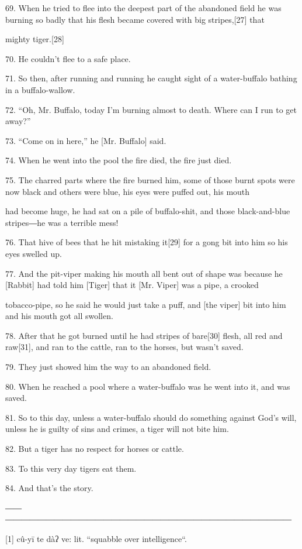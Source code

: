 {69. When he tried to flee into the deepest part of the abandoned field
he was burning so badly that his flesh became covered with big stripes,[27] that
}

{mighty tiger.[28]}

{70. He couldn't flee to a safe place.}

{71. So then, after running and running he caught sight of a water-buffalo
bathing in a buffalo-wallow.}

{72. ``Oh, Mr. Buffalo, today I'm burning almost to death. Where can I run
to get away?''}

{73. ``Come on in here,'' he [Mr. Buffalo] said.}

{74. When he went into the pool the fire died, the fire just died.}

{75. The charred parts where the fire burned him, some of those burnt spots
were now black and others were blue, his eyes were puffed out, his mouth      }

{had become huge, he had sat on a pile of buffalo-shit, and those black-and-blue
stripes―he was a terrible mess!}

{76. That hive of bees that he hit mistaking it[29] for a gong bit into
him so his eyes swelled up.}

{77. And the pit-viper making his mouth all bent out of shape was because
he [Rabbit] had told him [Tiger] that it [Mr. Viper] was a pipe, a crooked
}

{tobacco-pipe, so he said he would just take a puff, and [the viper] bit
into him and his mouth got all swollen.}

{78. After that he got burned until he had stripes of bare[30] flesh, all
red and raw[31], and ran to the cattle, ran to the horses, but wasn't saved.}

{79. They just showed him the way to an abandoned field.}

{80. When he reached a pool where a water-buffalo was he went into it, and
was saved.}

{81. So to this day, unless a water-buffalo should do something against
God's will, unless he is guilty of sins and crimes, a tiger will not bite him.}

{82. But a tiger has no respect for horses or cattle.}

{83. To this very day tigers eat them.}

{84. And that's the story.}

{――  ―――――――――――――――――――――――――――――――――――}

\leftskip=14pt
{[1] cû-yī te dàʔ ve: lit. ``squabble over intelligence``.}

